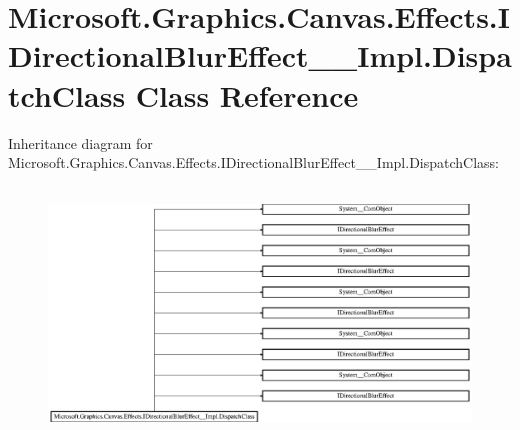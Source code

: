\hypertarget{class_microsoft_1_1_graphics_1_1_canvas_1_1_effects_1_1_i_directional_blur_effect_____impl_1_1_dispatch_class}{}\section{Microsoft.\+Graphics.\+Canvas.\+Effects.\+I\+Directional\+Blur\+Effect\+\_\+\+\_\+\+Impl.\+Dispatch\+Class Class Reference}
\label{class_microsoft_1_1_graphics_1_1_canvas_1_1_effects_1_1_i_directional_blur_effect_____impl_1_1_dispatch_class}
Inheritance diagram for Microsoft.\+Graphics.\+Canvas.\+Effects.\+I\+Directional\+Blur\+Effect\+\_\+\+\_\+\+Impl.\+Dispatch\+Class\+:\begin{figure}[H]
\begin{center}
\leavevmode
\includegraphics[height=6.666667cm]{class_microsoft_1_1_graphics_1_1_canvas_1_1_effects_1_1_i_directional_blur_effect_____impl_1_1_dispatch_class}
\end{center}
\end{figure}
